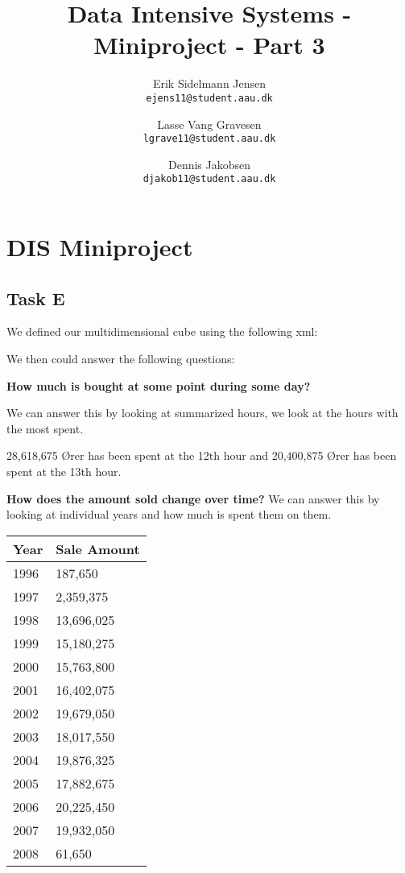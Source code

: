 

\author{
  Erik Sidelmann Jensen\\
  \texttt{ejens11@student.aau.dk}
  \and
  Lasse Vang Gravesen\\
  \texttt{lgrave11@student.aau.dk}
  \and
  Dennis Jakobsen\\
  \texttt{djakob11@student.aau.dk}  
}

\title{Data Intensive Systems - Miniproject - Part 3}
\date{}


	\clearpage\maketitle
	\thispagestyle{empty}
	
	\chapter{DIS Miniproject}
	\section{Task E}
	We defined our multidimensional cube using the following xml:
	
	
	We then could answer the following questions:
	
	\textbf{How much is bought at some point during some day?}
	
	We can answer this by looking at summarized hours, we look at the hours with the most spent.
	
	28,618,675 Ører has been spent at the 12th hour and 20,400,875 Ører has been spent at the 13th hour.
	
	\textbf{How does the amount sold change over time?}
	We can answer this by looking at individual years and how much is spent them on them.
	\begin{table}[H]
	    \begin{tabular}{l|l}
	    Year & Sale Amount \\ \hline
	    1996 & 187,650     \\
	    1997 & 2,359,375   \\
	    1998 & 13,696,025  \\
	    1999 & 15,180,275  \\
	    2000 & 15,763,800  \\
	    2001 & 16,402,075  \\
	    2002 & 19,679,050  \\
	    2003 & 18,017,550  \\
	    2004 & 19,876,325  \\
	    2005 & 17,882,675  \\
	    2006 & 20,225,450  \\
	    2007 & 19,932,050  \\
	    2008 & 61,650      \\
	    \end{tabular}
	\end{table}
	
